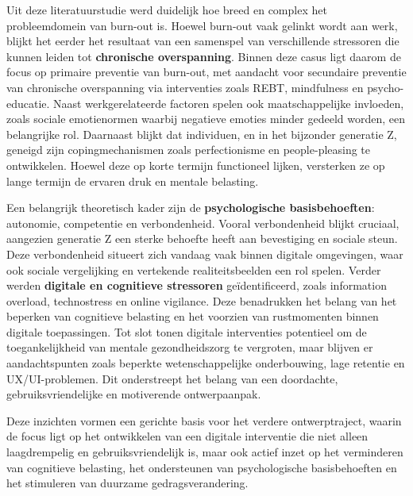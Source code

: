 Uit deze literatuurstudie werd duidelijk hoe breed en complex het probleemdomein van burn-out is. Hoewel burn-out vaak gelinkt wordt aan werk, blijkt het eerder het resultaat van een samenspel van verschillende stressoren die kunnen leiden tot \textbf{chronische overspanning}. Binnen deze casus ligt daarom de focus op primaire preventie van burn-out, met aandacht voor secundaire preventie van chronische overspanning via interventies zoals REBT, mindfulness en psycho-educatie. Naast werkgerelateerde factoren spelen ook maatschappelijke invloeden, zoals sociale emotienormen waarbij negatieve emoties minder gedeeld worden, een belangrijke rol. Daarnaast blijkt dat individuen, en in het bijzonder generatie Z, geneigd zijn copingmechanismen zoals perfectionisme en people-pleasing te ontwikkelen. Hoewel deze op korte termijn functioneel lijken, versterken ze op lange termijn de ervaren druk en mentale belasting.

\vspace{1em}

Een belangrijk theoretisch kader zijn de \textbf{psychologische basisbehoeften}: autonomie, competentie en verbondenheid. Vooral verbondenheid blijkt cruciaal, aangezien generatie Z een sterke behoefte heeft aan bevestiging en sociale steun. Deze verbondenheid situeert zich vandaag vaak binnen digitale omgevingen, waar ook sociale vergelijking en vertekende realiteitsbeelden een rol spelen. Verder werden \textbf{digitale en cognitieve stressoren} geïdentificeerd, zoals information overload, technostress en online vigilance. Deze benadrukken het belang van het beperken van cognitieve belasting en het voorzien van rustmomenten binnen digitale toepassingen. Tot slot tonen digitale interventies potentieel om de toegankelijkheid van mentale gezondheidszorg te vergroten, maar blijven er aandachtspunten zoals beperkte wetenschappelijke onderbouwing, lage retentie en UX/UI-problemen. Dit onderstreept het belang van een doordachte, gebruiksvriendelijke en motiverende ontwerpaanpak.

\vspace{1em}

Deze inzichten vormen een gerichte basis voor het verdere ontwerptraject, waarin de focus ligt op het ontwikkelen van een digitale interventie die niet alleen laagdrempelig en gebruiksvriendelijk is, maar ook actief inzet op het verminderen van cognitieve belasting, het ondersteunen van psychologische basisbehoeften en het stimuleren van duurzame gedragsverandering.

\vspace{1em}